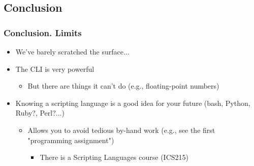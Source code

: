 \documentclass[utf8x,10pt]{beamer}
\begin{document}
\subsection{Conclusion}
\begin{frame}
  \frametitle{Conclusion. Limits}

  \begin{itemize}
  \item We've barely scratched the surface...
  \item The CLI is very powerful
	\begin{itemize}
	\item But there are things it can't do (e.g., floating-point numbers)
	\end{itemize}
  \item Knowing a scripting language is a good idea for your future
    (bash, Python, Ruby?, Perl?...)
    \begin{itemize}
    \item Allows you to avoid tedious by-hand work (e.g., see the first "programming assignment")
	\begin{itemize}
    	\item There is a Scripting Languages course (ICS215)
	\end{itemize}
    \end{itemize}
  \end{itemize}
\end{frame}
\end{document}
